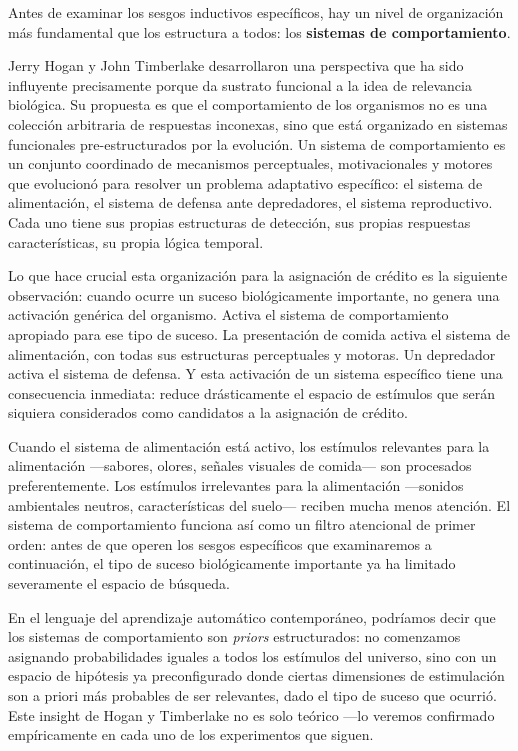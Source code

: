 \documentclass[
  letterpaper,
  DIV=11,
  numbers=noendperiod]{scrreprt}
\begin{document}
\begin{tcolorbox}[enhanced jigsaw, arc=.35mm, bottomrule=.15mm, breakable, colback=white, colframe=quarto-callout-note-color-frame, left=2mm, leftrule=.75mm, opacityback=0, rightrule=.15mm, toprule=.15mm]
Antes de examinar los sesgos inductivos específicos, hay un nivel de
organización más fundamental que los estructura a todos: los
\textbf{sistemas de comportamiento}.

Jerry Hogan y John Timberlake desarrollaron una perspectiva que ha sido
influyente precisamente porque da sustrato funcional a la idea de
relevancia biológica. Su propuesta es que el comportamiento de los
organismos no es una colección arbitraria de respuestas inconexas, sino
que está organizado en sistemas funcionales pre-estructurados por la
evolución. Un sistema de comportamiento es un conjunto coordinado de
mecanismos perceptuales, motivacionales y motores que evolucionó para
resolver un problema adaptativo específico: el sistema de alimentación,
el sistema de defensa ante depredadores, el sistema reproductivo. Cada
uno tiene sus propias estructuras de detección, sus propias respuestas
características, su propia lógica temporal.

Lo que hace crucial esta organización para la asignación de crédito es
la siguiente observación: cuando ocurre un suceso biológicamente
importante, no genera una activación genérica del organismo. Activa el
sistema de comportamiento apropiado para ese tipo de suceso. La
presentación de comida activa el sistema de alimentación, con todas sus
estructuras perceptuales y motoras. Un depredador activa el sistema de
defensa. Y esta activación de un sistema específico tiene una
consecuencia inmediata: reduce drásticamente el espacio de estímulos que
serán siquiera considerados como candidatos a la asignación de crédito.

Cuando el sistema de alimentación está activo, los estímulos relevantes
para la alimentación ---sabores, olores, señales visuales de comida---
son procesados preferentemente. Los estímulos irrelevantes para la
alimentación ---sonidos ambientales neutros, características del
suelo--- reciben mucha menos atención. El sistema de comportamiento
funciona así como un filtro atencional de primer orden: antes de que
operen los sesgos específicos que examinaremos a continuación, el tipo
de suceso biológicamente importante ya ha limitado severamente el
espacio de búsqueda.

En el lenguaje del aprendizaje automático contemporáneo, podríamos decir
que los sistemas de comportamiento son \emph{priors} estructurados: no
comenzamos asignando probabilidades iguales a todos los estímulos del
universo, sino con un espacio de hipótesis ya preconfigurado donde
ciertas dimensiones de estimulación son a priori más probables de ser
relevantes, dado el tipo de suceso que ocurrió. Este insight de Hogan y
Timberlake no es solo teórico ---lo veremos confirmado empíricamente en
cada uno de los experimentos que siguen.


\end{tcolorbox}
\end{document}
